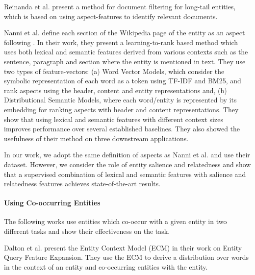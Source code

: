 Reinanda et al. \cite{reinanda2016document} present a method for document filtering for long-tail entities, which is based on using aspect-features to identify relevant documents. 

Nanni et al. \cite{nanni2018entity} define each section of the Wikipedia page of the entity as an aspect following \cite{fetahu2015automated,banerjee2015wikikreator,reinanda2016document}.
In their work, they present a learning-to-rank based method which uses both lexical and semantic features derived from various contexts such as the sentence, paragraph and section where the entity is mentioned in text. They use two types of feature-vectors: (a) Word Vector Models, which consider the symbolic representation of each word as a token using TF-IDF and BM25, and rank aspects using the header, content and entity representations and, (b) Distributional Semantic Models, where each word/entity is represented by its embedding for ranking aspects with header and content representations. They show that using lexical and semantic features with different context sizes improves performance over several established baselines. They also showed the usefulness of their method on three downstream applications.  



In our work, we adopt the same definition of aspects as Nanni  et al. \cite{nanni2018entity} and use their dataset. However, we consider the role of entity salience and relatedness and show that a supervised combination of lexical and semantic features with salience and relatedness features achieves state-of-the-art results.

\paragraph{\textbf{Using Co-occurring Entities}}
The following works use entities which co-occur with a given entity in two different tasks and show their effectiveness on the task. 

Dalton et al. \cite{dalton2014entity} present the Entity Context Model (ECM) in their work on Entity Query Feature Expansion. They use the ECM to derive a distribution over words in the context of an entity and co-occurring entities with the entity.

